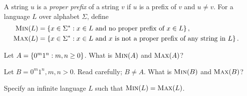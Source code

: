\begin{problem}
  A string $u$ is a \emph{proper prefix} of a string $v$ if $u$ is a prefix of $v$ and $u \neq v$.
  For a language $L$ over alphabet $\Sigma$, define
  \begin{align*}
    \textsc{Min}(L) &= \left\{x \in \Sigma^* : x \in L \text{ and no proper prefix of } x \in L\right\},\\
    \textsc{Max}(L) &= \left\{x \in \Sigma^* : x \in L \text{ and $x$ is not a proper prefix of any string in $L$}\right\}.
  \end{align*}

  \begin{enumalph}
    \item Let $A = \left\{0^m1^n : m, n \ge 0\right\}$. What is $\textsc{Min}(A)$ and $\textsc{Max}(A)$?
      \begin{Answer}
        
      \end{Answer}
    \item Let $B = 0^m1^n, m, n > 0$. Read carefully; $B \neq A$. What is $\textsc{Min}(B)$ and $\textsc{Max}(B)$?
      \begin{Answer}
        
      \end{Answer}

    \item Specify an infinite language $L$ such that $\textsc{Min}(L) = \textsc{Max}(L)$.
      \begin{Answer}
        
      \end{Answer}
  \end{enumalph}
\end{problem}
